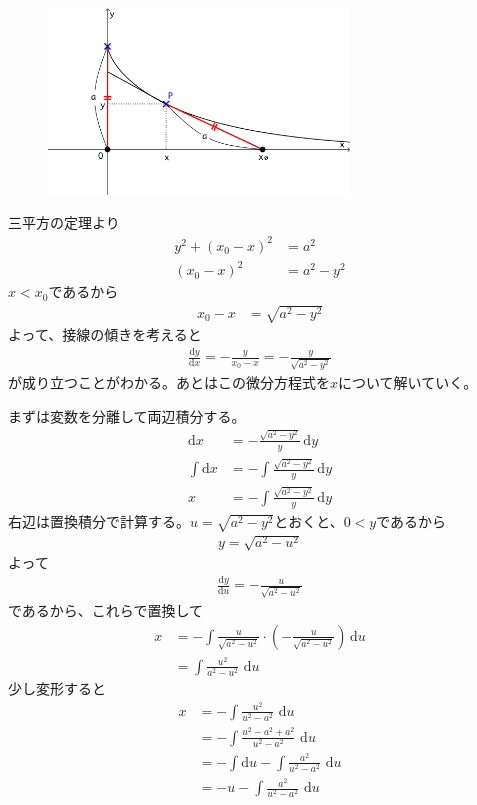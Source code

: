 \begin{figure}[H]
  \centering
  \includegraphics[width=8cm]{nakayama1/image/trac2}
\end{figure}

三平方の定理より
\begin{align*}
  y^2 + (x_0 - x)^2 &= a^2 \\
  (x_0 - x)^2 &= a^2 - y^2
\end{align*}
$x < x_0$であるから
\begin{align*}
  x_0 - x &= \sqrt{a^2 - y^2}
\end{align*}
よって、接線の傾きを考えると
\begin{align*}
  \frac{\mathrm{d}y}{\mathrm{d}x} = - \frac{y}{x_0 - x} = - \frac{y}{\sqrt{a^2 - y^2}}
\end{align*}
が成り立つことがわかる。あとはこの微分方程式を$x$について解いていく。\par
まずは変数を分離して両辺積分する。
\begin{align*}
  \mathrm{d}x &= - \frac{\sqrt{a^2 - y^2}}{y} \,\mathrm{d}y \\
  \int \mathrm{d}x &= - \int \frac{\sqrt{a^2 - y^2}}{y} \,\mathrm{d}y \\
  x &= - \int \frac{\sqrt{a^2 - y^2}}{y} \,\mathrm{d}y
\end{align*}
右辺は置換積分で計算する。$u = \sqrt{a^2 - y^2}$とおくと、$0 < y$であるから
\begin{align*}
  y = \sqrt{a^2 - u^2}
\end{align*}
よって
\begin{align*}
  \frac{\mathrm{d}y}{\mathrm{d}u} = - \frac{u}{\sqrt{a^2 - u^2}}
\end{align*}
であるから、これらで置換して
\begin{align*}
  x &= - \int \frac{u}{\sqrt{a^2 - u^2}} \cdot \left(- \frac{u}{\sqrt{a^2 - u^2}}\right) \,\mathrm{d}u \\
  &= \int \frac{u^2}{a^2 - u^2} \,\,\mathrm{d}u
\end{align*}
少し変形すると
\begin{align*}
  x &= - \int \frac{u^2}{u^2 - a^2} \,\,\mathrm{d}u \\
  &= - \int \frac{u^2 - a^2 + a^2}{u^2 - a^2} \,\,\mathrm{d}u \\
  &= - \int\mathrm{d}u - \int \frac{a^2}{u^2 - a^2} \,\,\mathrm{d}u \\
  &= - u - \int \frac{a^2}{u^2 - a^2} \,\,\mathrm{d}u
\end{align*}
